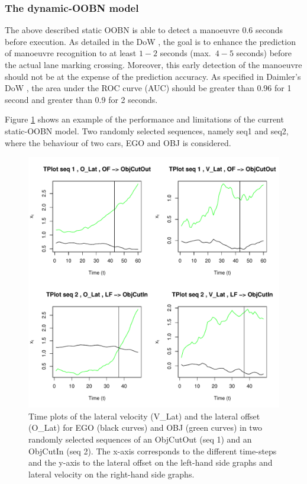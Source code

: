 \subsubsection*{The dynamic-OOBN model}\label{Section:DaimlerDynamic}

The above described static OOBN is able to detect a manoeuvre $0.6$ seconds before execution. As detailed in the DoW \cite{Fer14}, the goal is to enhance the prediction of manoeuvre recognition to at least $1-2$ seconds (max.\ $4-5$ seconds) before the actual lane marking crossing. Moreover, this early detection of the manoeuvre should not be at the expense of the prediction accuracy. As specified in Daimler's DoW \cite{Fer14}, the area under the ROC curve (AUC) should be greater than 0.96 for 1 second and greater than 0.9 for 2 seconds.

Figure \ref{Figure:daimlerTPlot} shows an example of the performance and limitations of the current static-OOBN model. Two randomly selected sequences, namely seq1 and seq2, where the behaviour of two cars, EGO and OBJ is considered. 

\begin{figure}[ht!]
\begin{center}
\includegraphics[scale=0.65]{./figures/DaimlerLE_EGO_L_LE_OBJ_R_OBJCut.pdf}
\caption{\label{Figure:daimlerTPlot}Time plots of the lateral velocity (V\_Lat) and the lateral offset (O\_Lat) for EGO (black curves) and OBJ (green curves) in two randomly selected sequences of an ObjCutOut (seq 1) and an ObjCutIn (seq 2). The x-axis corresponds to the different time-steps and the y-axis to the lateral offset on the left-hand side graphs and lateral velocity on the right-hand side graphs.}
\end{center}
\end{figure}


